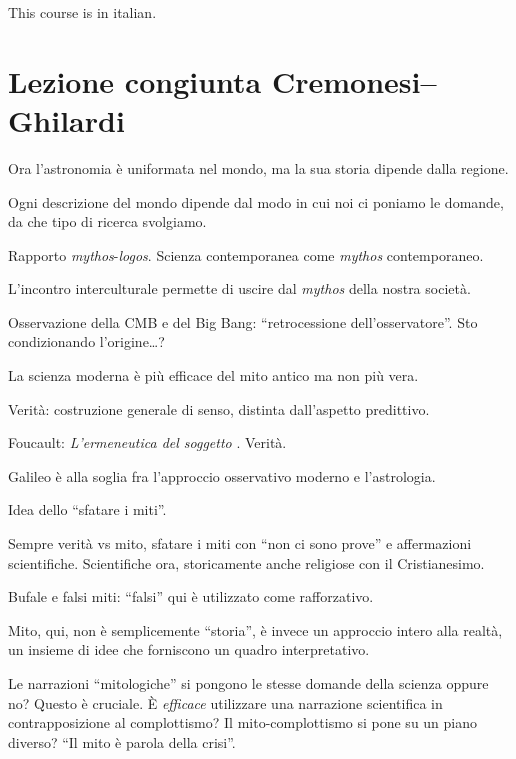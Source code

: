 \documentclass[main.tex]{subfiles}
\begin{document}
This course is in italian. 


\section{Lezione congiunta Cremonesi--Ghilardi} 

Ora l'astronomia è uniformata nel mondo, ma la sua storia dipende dalla regione. 

Ogni descrizione del mondo dipende dal modo in cui noi ci poniamo le domande, da che tipo di ricerca svolgiamo. 

Rapporto \emph{mythos}-\emph{logos}. 
Scienza contemporanea come \emph{mythos} contemporaneo. 

L'incontro interculturale permette di uscire dal \emph{mythos} della nostra società. 

Osservazione della CMB e del Big Bang: ``retrocessione dell'osservatore''.
Sto condizionando l'origine\dots?

La scienza moderna è più efficace del mito antico ma non più vera. 

Verità: costruzione generale di senso, distinta dall'aspetto predittivo. 

Foucault: \emph{L'ermeneutica del soggetto} \cite[]{foucaultErmeneuticaSoggetto1982}. 
Verità.

Galileo è alla soglia fra l'approccio osservativo moderno e l'astrologia.

Idea dello ``sfatare i miti''.

Sempre verità vs mito, sfatare i miti con ``non ci sono prove'' e affermazioni scientifiche. 
Scientifiche ora, storicamente anche religiose con il Cristianesimo. 

Bufale e falsi miti: ``falsi'' qui è utilizzato come rafforzativo. 

Mito, qui, non è semplicemente ``storia'', è invece un approccio intero alla realtà, un insieme di idee che forniscono un quadro interpretativo.

Le narrazioni ``mitologiche'' si pongono le stesse domande della scienza oppure no? Questo è cruciale. 
È \emph{efficace} utilizzare una narrazione scientifica in contrapposizione al complottismo? 
Il mito-complottismo si pone su un piano diverso? 
``Il mito è parola della crisi''.  
\end{document}
